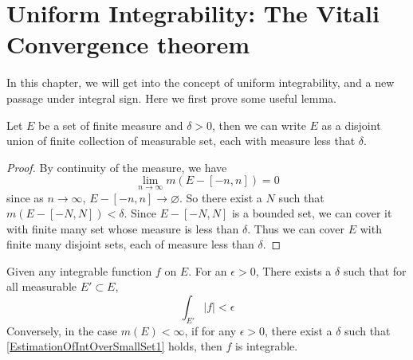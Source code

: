 \documentclass[lang=en, 12pt]{elegantbook}
\begin{document}
    \section{Uniform Integrability: The Vitali Convergence theorem}
            In this chapter, we will get into the concept of uniform integrability, and a new passage under integral sign. Here we first 
        prove some useful lemma.
        \begin{lemma}\label{UniformIntegrableLemma}
            Let $E$ be a set of finite measure and $\delta > 0$, then we can write $E$ as a disjoint union of finite collection of measurable
        set, each with measure less that $\delta$.
        \end{lemma}
        \begin{proof}
            By continuity of the measure, we have 
            $$\lim_{n \to \infty} m(E - [-n, n]) = 0$$
        since as $n \to \infty$, $E-[-n,n] \to \varnothing$. So there exist a $N$ such that $m(E-[-N,N]) < {\delta}$. Since 
        $E-[-N,N]$ is a bounded set, we can cover it with finite many set whose measure is less than $\delta$.
        Thus we can cover $E$ with finite many disjoint sets, each of 
        measure less than $\delta$.
        \end{proof}
        \begin{proposition}\label{EstimationOfIntOverSmallSet}
            Given any integrable function $f$ on $E$. For an $\epsilon >0$,
        There exists a $\delta$ such that for all measurable $E' \subset E$,
        \begin{equation}\label{EstimationOfIntOverSmallSet1}
            \int_{E'} |f| < \epsilon
        \end{equation}
        Conversely, in the case $m(E)< \infty$, if for any $\epsilon>0$,
        there exist a $\delta$ such that \eqref{EstimationOfIntOverSmallSet1}
        holds, then $f$ is integrable.
        \end{proposition}
\end{document}
